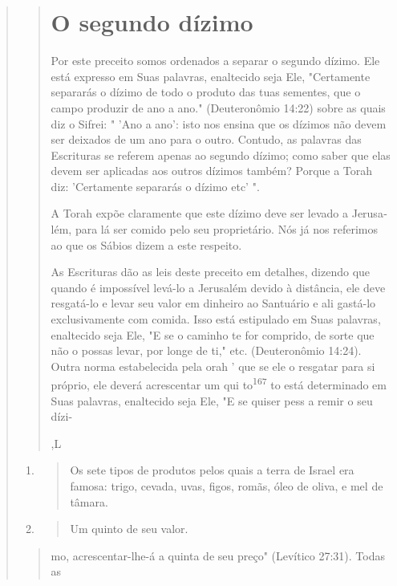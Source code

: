 \begin{quote}
\begin{quote}
\section{O segundo dízimo}

Por este preceito somos ordenados a separar o segundo dízimo. Ele está
expresso em Suas palavras, enaltecido seja Ele, "Certamente separarás o
dízimo de todo o produto das tuas sementes, que o campo produzir de ano
a ano." (Deuteronômio 14:22) sobre as quais diz o Sifrei: " 'Ano a ano':
isto nos ensina que os dízimos não devem ser deixados de um ano para o
outro. Contudo, as palavras das Escrituras se referem apenas ao segundo
dízimo; co­mo saber que elas devem ser aplicadas aos outros dízimos
também? Porque a Torah diz: 'Certamente separarás o dízimo etc' ".

A Torah expõe claramente que este dízimo deve ser levado a Jerusa­lém,
para lá ser comido pelo seu proprietário. Nós já nos referimos ao que os
Sábios dizem a este respeito.

As Escrituras dão as leis deste preceito em detalhes, dizendo que
quan­do é impossível levá-lo a Jerusalém devido à distância, ele deve
resgatá-lo e le­var seu valor em dinheiro ao Santuário e ali gastá-lo
exclusivamente com comi­da. Isso está estipulado em Suas palavras,
enaltecido seja Ele, "E se o caminho te for comprido, de sorte que não o
possas levar, por longe de ti," etc. (Deuteronômio 14:24). Outra norma
estabelecida pela orah ' que se ele o res­gatar para si próprio, ele
deverá acrescentar um qui to\textsuperscript{167} to está determi­nado
em Suas palavras, enaltecido seja Ele, "E se quiser pess a remir o seu
dízi-

{,L}
\end{quote}

\begin{enumerate}
\def\labelenumi{\arabic{enumi}.}
\setcounter{enumi}{165}
\item
 \begin{quote}
 Os sete tipos de produtos pelos quais a terra de Israel era famosa:
 trigo, cevada, uvas, figos, romãs, óleo de oliva, e mel de tâmara.
 \end{quote}
\item
 \begin{quote}
 Um quinto de seu valor.
 \end{quote}
\end{enumerate}

\begin{quote}mo, acrescentar-lhe-á a quinta de seu preço" (Levítico 27:31). Todas as


\end{quote}
\end{quote}
